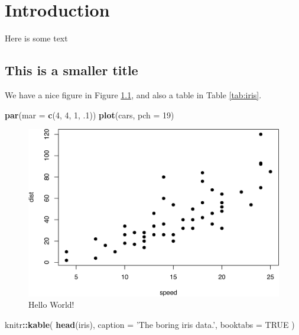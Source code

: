 \documentclass[
]{krantz}
\makeatletter
\newenvironment{Shaded}{\begin{snugshade}}{\end{snugshade}}
\newcommand{\DataTypeTok}[1]{\textcolor[rgb]{0.13,0.29,0.53}{#1}}
\newcommand{\DecValTok}[1]{\textcolor[rgb]{0.00,0.00,0.81}{#1}}
\newcommand{\FloatTok}[1]{\textcolor[rgb]{0.00,0.00,0.81}{#1}}
\newcommand{\KeywordTok}[1]{\textcolor[rgb]{0.13,0.29,0.53}{\textbf{#1}}}
\newcommand{\NormalTok}[1]{#1}
\newcommand{\OperatorTok}[1]{\textcolor[rgb]{0.81,0.36,0.00}{\textbf{#1}}}
\newcommand{\OtherTok}[1]{\textcolor[rgb]{0.56,0.35,0.01}{#1}}
\newcommand{\StringTok}[1]{\textcolor[rgb]{0.31,0.60,0.02}{#1}}
\newenvironment{kframe}{%
\medskip{}
\setlength{\fboxsep}{.8em}
 \def\at@end@of@kframe{}%
 \ifinner\ifhmode%
  \def\at@end@of@kframe{\end{minipage}}%
  \begin{minipage}{\columnwidth}%
 \fi\fi%
 \def\FrameCommand##1{\hskip\@totalleftmargin \hskip-\fboxsep
 \colorbox{shadecolor}{##1}\hskip-\fboxsep
     \hskip-\linewidth \hskip-\@totalleftmargin \hskip\columnwidth}%
 \MakeFramed {\advance\hsize-\width
   \@totalleftmargin\z@ \linewidth\hsize
   \@setminipage}}%
 {\par\unskip\endMakeFramed%
 \at@end@of@kframe}
\renewenvironment{Shaded}{\begin{kframe}}{\end{kframe}}
\makeatother
\begin{document}
\hypertarget{introduction}{%
\chapter{Introduction}\label{introduction}}

Here is some text

\hypertarget{this-is-a-smaller-title}{%
\section{This is a smaller title}\label{this-is-a-smaller-title}}

We have a nice figure in Figure \ref{fig:hello}, and also a table in Table \ref{tab:iris}.

\begin{Shaded}
\begin{Highlighting}[]
\KeywordTok{par}\NormalTok{(}\DataTypeTok{mar =} \KeywordTok{c}\NormalTok{(}\DecValTok{4}\NormalTok{, }\DecValTok{4}\NormalTok{, }\DecValTok{1}\NormalTok{, }\FloatTok{.1}\NormalTok{))}
\KeywordTok{plot}\NormalTok{(cars, }\DataTypeTok{pch =} \DecValTok{19}\NormalTok{)}
\end{Highlighting}
\end{Shaded}

\begin{figure}
\includegraphics[width=0.9\linewidth]{book_files/figure-latex/hello-1} \caption{Hello World!}\label{fig:hello}
\end{figure}

\begin{Shaded}
\begin{Highlighting}[]
\NormalTok{knitr}\OperatorTok{::}\KeywordTok{kable}\NormalTok{(}
  \KeywordTok{head}\NormalTok{(iris), }\DataTypeTok{caption =} \StringTok{'The boring iris data.'}\NormalTok{,}
  \DataTypeTok{booktabs =} \OtherTok{TRUE}
\NormalTok{)}
\end{Highlighting}
\end{Shaded}
\end{document}
